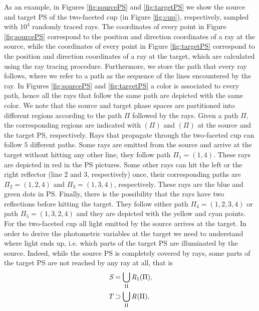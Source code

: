 As an example, in Figures \ref{fig:sourcePS} and \ref{fig:targetPS} we show the source and target PS of the two-faceted cup (in Figure \ref{fig:cup}), respectively, sampled with $10^4$ randomly traced rays. The coordinates of every point in Figure \ref{fig:sourcePS} correspond to the position and direction coordinates of a ray at the source, while the coordinates of every point in Figure \ref{fig:targetPS} correspond to the position and direction coordinates of a ray at the target, which are calculated using the ray tracing procedure. Furthermore, we store the path that every ray follows, where we refer to a path as the sequence of the lines encountered by the ray.
In Figures \ref{fig:sourcePS} and \ref{fig:targetPS} a color is associated to every path, hence all the rays that follow the same path are depicted with the same color.
We note that the source and target phase spaces are partitioned into different regions according to the path $\Pi$ followed by the rays.
Given a path $\Pi$, the corresponding regions are indicated with $(\Pi)$ and $(\Pi)$ at the source and the target PS, respectively.
Rays that propagate through the two-faceted cup can follow $5$ different paths. Some rays are emitted from the source and arrive at the target without hitting any other line, they follow path $\Pi_1= (1,4)$. These rays are depicted in red in the PS pictures. Some other rays can hit the left or the right reflector (line $2$ and $3$, respectively) once, their corresponding paths are $\Pi_2 = (1,2,4)$ and $\Pi_3 = (1,3,4)$, respectively. These rays are the blue and green dots in PS. Finally, there is the possibility that the rays have two reflections before hitting the target. They follow either path $\Pi_4 = (1,2,3,4)$ or path $\Pi_5 = (1,3,2,4)$ and they are depicted with the yellow and cyan points.
\\ \indent For the two-faceted cup all light emitted by the source arrives at the target. In order to derive the photometric variables at the target we need to understand where light ends up, i.e. which parts of the target PS are illuminated by the source. Indeed, while the source PS is completely covered by rays, some parts of the target PS are not reached by any ray at all, that is 
\begin{equation}
\begin{aligned}
\mbox{$\emph{S}_{\textit{}}$} &= \bigcup_{\Pi} \mbox{$\emph{R}_{\textit{$1$}}$}(\Pi),\\
\mbox{$\emph{T}_{\textit{}}$} &\supset \bigcup_{\Pi} \mbox{$\emph{R}_{\textit{}}$}(\Pi),
\end{aligned}
\end{equation}

